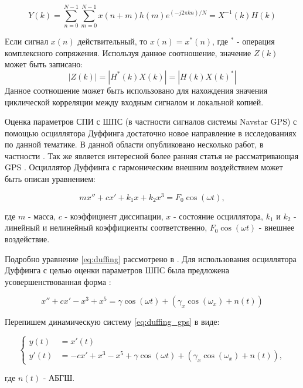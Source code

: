 \begin{equation}
	\label{eq:fft_corr_fft_rev}
	Y(k) = \sum\limits_{n=0}^{N-1}\sum\limits_{m=0}^{N-1}{x(n+m)h(m)e^{(-j2\pi{kn})/N}}=X^{-1}(k)H(k)
\end{equation}

Если сигнал $x(n)$ действительный, то $x(n) = x^*(n)$, где ${^*}$ - операция комплексного сопряжения. Используя данное соотношение,
значение $Z(k)$ может быть записано:
\begin{equation}
	\label{eq:fft_magnitude}
	|Z(k)|=|H^*(k)X(k)|=|H(k)X(k)^*|
\end{equation}
Данное соотношение может быть использовано для нахождения значения циклической корреляции между входным сигналом и 
локальной копией.

Оценка параметров СПИ с ШПС (в частности сигналов системы Navstar GPS) с помощью осциллятора Дуффинга
достаточно новое направление в исследованиях по данной тематике. В данной области опубликовано несколько работ, в частности \cite{chaos_chen, chaos_cambridge, chaos_huang, chaos_song}.
Так же является интересной более ранняя статья не рассматривающая GPS \cite{chaos_wang}.
Осциллятор Дуффинга с гармоническим внешним воздействием может быть описан уравнением:
\begin{center}
\begin{equation}
	\label{eq:duffing}
	mx'' + cx' + k_{1}x + k_{2}x^3 = F_{0}\cos(\omega{t}),
\end{equation}
\end{center}
где $m$ - масса, $c$ - коэффициент диссипации, $x$ - состояние осциллятора, $k_1$ и $k_2$ - линейный и нелинейный коэффициенты соответственно,
$F_{0}\cos(\omega{t})$ - внешнее воздействие.

Подробно уравнение \ref{eq:duffing} рассмотрено в \cite{chaos_neimark_landa}.
Для использования осциллятора Дуффинга с целью оценки параметров ШПС была предложена усовершенствованная форма \cite{chaos_song, chaos_chen}:
\begin{center}
\begin{equation}
	\label{eq:duffing_gps}
	x'' +cx' - x^3 + x^5 = \gamma\cos(\omega{t}) + (\gamma_{x}\cos(\omega_{x}) + n(t))
\end{equation}
\end{center}

Перепишем динамическую систему \ref{eq:duffing_gps} в виде:
\begin{center}
\begin{equation}
	\label{eq:duffing_gps_2}
	\left\{
	\begin{aligned}
		y(t) & = x'(t) \\
		y'(t) & =  -cx' + x^3 - x^5 + \gamma\cos(\omega{t}) + (\gamma_{x}\cos(\omega_{x}) + n(t)),
	\end{aligned}
	\right.
\end{equation}
\end{center}
где ${n(t)}$ - АБГШ.

